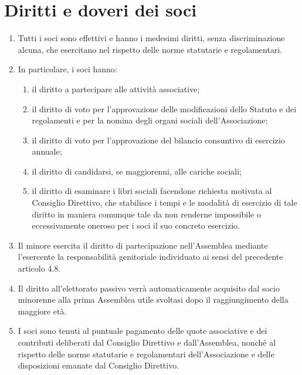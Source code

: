 \documentclass{djtsdoc}
\begin{document}
	\section{Diritti e doveri dei soci}
	\begin{enumerate}
		\item Tutti i soci sono effettivi e hanno i medesimi diritti, senza discriminazione alcuna, che esercitano nel rispetto delle norme statutarie e regolamentari.
		\item In particolare, i soci hanno:
		\begin{enumerate}
			\item il diritto a partecipare alle attività associative;
			\item il diritto di voto per l'approvazione delle modificazioni dello Statuto e dei regolamenti e per la nomina degli organi sociali dell'Associazione;
			\item il diritto di voto per l'approvazione del bilancio consuntivo di esercizio annuale;
			\item il diritto di candidarsi, se maggiorenni, alle cariche sociali;
			\item il diritto di esaminare i libri sociali facendone richiesta motivata al Consiglio Direttivo, che stabilisce i tempi e le modalità di esercizio di tale diritto in maniera comunque tale da non renderne impossibile o eccessivamente oneroso per i soci il suo concreto esercizio.
		\end{enumerate}
		\item Il minore esercita il diritto di partecipazione nell'Assemblea mediante l'esercente la responsabilità genitoriale individuato ai sensi del precedente articolo 4.8.
		\item Il diritto all'elettorato passivo verrà automaticamente acquisito dal socio minorenne alla prima Assemblea utile svoltasi dopo il raggiungimento della maggiore età.
		\item I soci sono tenuti al puntuale pagamento delle quote associative e dei contributi deliberati dal Consiglio Direttivo e dall'Assemblea, nonché al rispetto delle norme statutarie e regolamentari dell'Associazione e delle disposizioni emanate dal Consiglio Direttivo.
	\end{enumerate}
	
\end{document}

